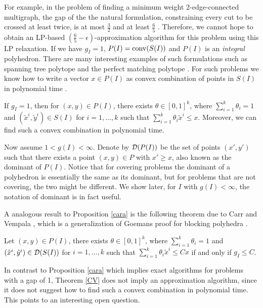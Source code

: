 For example, in the problem of finding a minimum weight 2-edge-connected multigraph, the gap of the the natural formulation, constraining every cut to be crossed at least twice, is at most $\frac{3}{2}$ \cite{Wolsey1980} and at least $\frac{6}{5}$ \cite{carr-ravi}. Therefore, we cannot hope to obtain an LP-based $(\frac{6}{5}-\epsilon)$-approximation algorithm for this problem using this LP relaxation. If we have $g_I=1$, $P(I)=\operatorname{conv}(S(I))$ and $P(I)$ is an \textit{integral} polyhedron. There are many interesting examples of such formulations such as spanning tree polytope and the perfect matching polytope \cite{schrijver}. For such problems we know how to write a vector $x\in P(I)$ as convex combination of points in $S(I)$ in polynomial time \cite{cons-cara}.

\begin{proposition}\label{cara}
	If $g_I=1$, then for $(x,y)\in P(I)$, there exists $\theta \in [0,1]^k$, where $\sum_{i=1}^{k}\theta_i =1$ and $(\tilde{x}^i,\tilde{y}^i)\in S(I)$ for $i=1,\ldots,k$ such that $\sum_{i=1}^{k}\theta_i \tilde{x}^i\leq x$. Moreover, we can find such a convex combination in polynomial time.
\end{proposition}

Now assume $1<g(I)<\infty$. Denote by $\operatorname{\mathcal{D}}(P(I))$ be the set of points $(x',y')$ such that there exists a point $(x,y)\in P$ with $x'\geq x$, also known as the dominant of $P(I)$. Notice that for covering problems the dominant of a polyhedron is essentially the same as its dominant, but for problems that are not covering, the two might be different. We show later, for $I$ with $g(I)<\infty$, the notation of dominant is in fact useful.

A analogous result to Proposition \ref{cara} is the following theorem due to Carr and Vempala \cite{CV}, which is a generalization of Goemans proof for blocking polyhedra \cite{goemans}. 

\begin{theorem} \label{CV}
	Let $(x,y)\in P(I)$, there exists $\theta \in [0,1]^k$, where $\sum_{i=1}^{k}\theta_i =1$ and $(\tilde{x}^i,\tilde{y}^i)\in \operatorname{\mathcal{D}}(S(I))$ for $i=1,\ldots,k$ such that $\sum_{i=1}^{k}\theta_i \tilde{x}^i\leq Cx$ if and only if $g_I \leq C$.
\end{theorem}

In contrast to Proposition \ref{cara} which implies exact algorithms for problems with a gap of 1, Theorem \ref{CV} does not imply an approximation algorithm, since it does not suggest how to find such a convex combination in polynomial time. This points to an interesting open question. 

